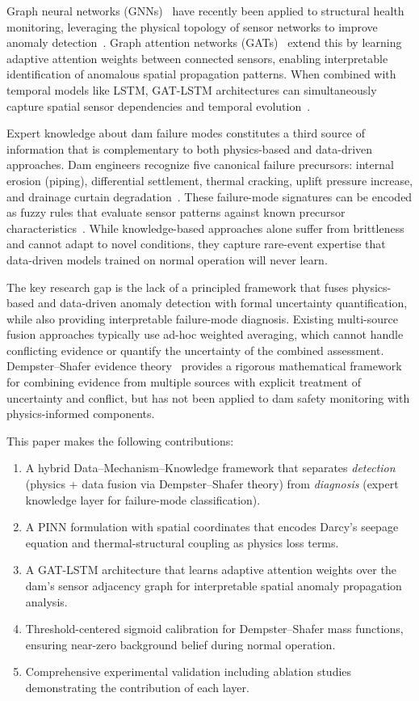 \documentclass[preprint,12pt,review]{elsarticle}
\begin{document}
Graph neural networks (GNNs)~\cite{kipf2017semi} have recently been applied to structural health monitoring, leveraging the physical topology of sensor networks to improve anomaly detection~\cite{li2020graph}. Graph attention networks (GATs)~\cite{velickovic2018graph} extend this by learning adaptive attention weights between connected sensors, enabling interpretable identification of anomalous spatial propagation patterns. When combined with temporal models like LSTM, GAT-LSTM architectures can simultaneously capture spatial sensor dependencies and temporal evolution~\cite{tong2023dam}.

Expert knowledge about dam failure modes constitutes a third source of information that is complementary to both physics-based and data-driven approaches. Dam engineers recognize five canonical failure precursors: internal erosion (piping), differential settlement, thermal cracking, uplift pressure increase, and drainage curtain degradation~\cite{su2011study,ICOLD2018}. These failure-mode signatures can be encoded as fuzzy rules that evaluate sensor patterns against known precursor characteristics~\cite{su2011study}. While knowledge-based approaches alone suffer from brittleness and cannot adapt to novel conditions, they capture rare-event expertise that data-driven models trained on normal operation will never learn.

The key research gap is the lack of a principled framework that fuses physics-based and data-driven anomaly detection with formal uncertainty quantification, while also providing interpretable failure-mode diagnosis. Existing multi-source fusion approaches typically use ad-hoc weighted averaging, which cannot handle conflicting evidence or quantify the uncertainty of the combined assessment. Dempster--Shafer evidence theory~\cite{shafer1976mathematical,dempster1968generalization} provides a rigorous mathematical framework for combining evidence from multiple sources with explicit treatment of uncertainty and conflict, but has not been applied to dam safety monitoring with physics-informed components.

This paper makes the following contributions:
\begin{enumerate}
\item A hybrid Data--Mechanism--Knowledge framework that separates \emph{detection} (physics + data fusion via Dempster--Shafer theory) from \emph{diagnosis} (expert knowledge layer for failure-mode classification).
\item A PINN formulation with spatial coordinates that encodes Darcy's seepage equation and thermal-structural coupling as physics loss terms.
\item A GAT-LSTM architecture that learns adaptive attention weights over the dam's sensor adjacency graph for interpretable spatial anomaly propagation analysis.
\item Threshold-centered sigmoid calibration for Dempster--Shafer mass functions, ensuring near-zero background belief during normal operation.
\item Comprehensive experimental validation including ablation studies demonstrating the contribution of each layer.
\end{enumerate}
\end{document}
